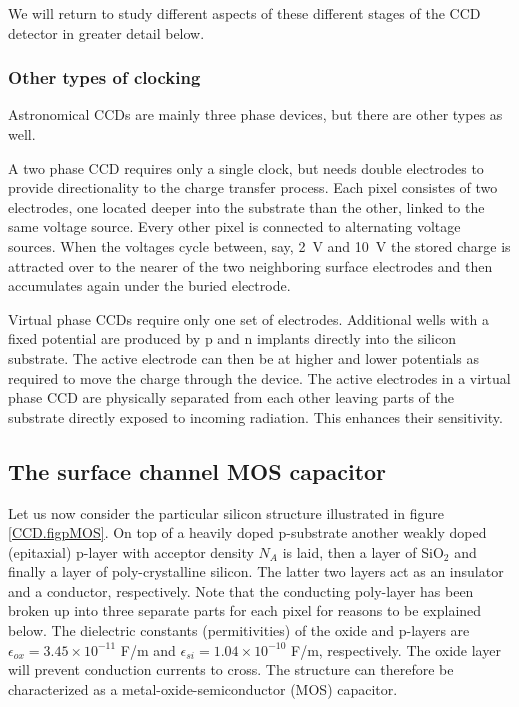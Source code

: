 \documentclass{article}
\begin{document}
We will return to study different aspects of these different stages of
the CCD detector in greater detail below.

\subsubsection*{Other types of clocking}

Astronomical CCDs are mainly three phase devices, but there are other types
as well. 

A two phase CCD requires only a single clock, but needs double electrodes 
to provide directionality to the charge transfer process. Each pixel consistes
of two electrodes, one located deeper into the substrate than the other, 
linked to the same voltage source. Every other pixel is connected to 
alternating voltage sources. When the voltages cycle between, say, 2~V and
10~V the stored charge is attracted over to the nearer of the two neighboring
surface electrodes and then accumulates again under the buried electrode.

Virtual phase CCDs require only one set of electrodes. Additional wells with
a fixed potential are produced by p and n implants directly into the silicon
substrate. The active electrode can then be at higher and lower potentials 
as required to move the charge through the device. The active electrodes
in a virtual phase CCD are physically separated from each other leaving 
parts of the substrate directly exposed to incoming radiation. This 
enhances their sensitivity.

\subsection*{The surface channel MOS capacitor}

Let us now consider the particular silicon structure illustrated in
figure \ref{CCD.figpMOS}. On top of a heavily doped p-substrate
another weakly doped (epitaxial) p-layer with acceptor density $N_A$
is laid, then a layer of SiO$_2$ and finally a layer of
poly-crystalline silicon. The latter two layers act as an insulator and
a conductor, respectively. Note that the conducting poly-layer has
been broken up into three separate parts for each pixel for reasons to
be explained below. The dielectric constants (permitivities) of the
oxide and p-layers are $\epsilon_{ox} = 3.45 \times 10^{-11}$ F/m and
$\epsilon_{si} = 1.04\times 10^{-10}$ F/m, respectively.  The oxide
layer will prevent conduction currents to cross. The structure can
therefore be characterized as a metal-oxide-semiconductor (MOS)
capacitor.
\end{document}
